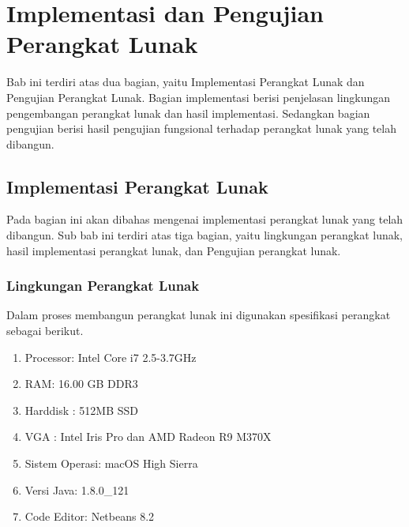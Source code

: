 \lstset{style=mystyle}
\chapter{Implementasi dan Pengujian Perangkat Lunak}
\label{sec: Implementasi dan Pengujian Perangkat Lunak}

Bab ini terdiri atas dua bagian, yaitu Implementasi Perangkat Lunak dan Pengujian Perangkat Lunak. Bagian implementasi berisi penjelasan lingkungan pengembangan perangkat lunak dan hasil implementasi. Sedangkan bagian pengujian berisi hasil pengujian fungsional terhadap perangkat lunak yang telah dibangun.
\section{Implementasi Perangkat Lunak}
\label{sec: Implementasi Perangkat Lunak}

Pada bagian ini akan dibahas mengenai implementasi perangkat lunak yang telah dibangun. Sub bab ini terdiri atas tiga bagian, yaitu lingkungan perangkat lunak, hasil implementasi perangkat lunak, dan Pengujian perangkat lunak.

\subsection{Lingkungan Perangkat Lunak}
\label{sec:lingkungan perangkat lunak}
Dalam proses membangun perangkat lunak ini digunakan spesifikasi perangkat sebagai berikut.

\begin{enumerate}
	\item Processor: Intel Core i7 2.5-3.7GHz 
	\item RAM: 16.00 GB DDR3	
	\item Harddisk : 512MB SSD
	\item VGA : Intel Iris Pro dan AMD Radeon R9 M370X
	\item Sistem Operasi: macOS High Sierra
	\item Versi Java: 1.8.0\_121
	\item Code Editor: Netbeans 8.2
\end{enumerate}

